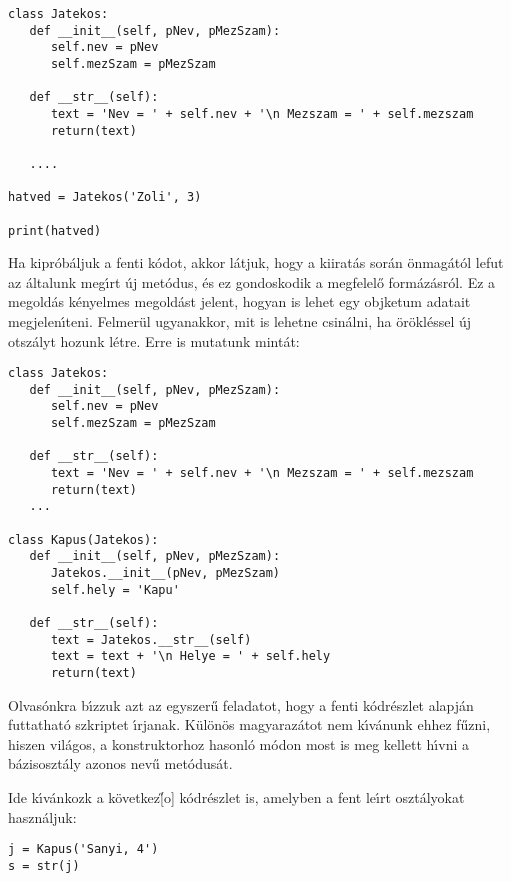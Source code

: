 \begin{Verbatim}[fontsize=\small]
class Jatekos:
   def __init__(self, pNev, pMezSzam):
      self.nev = pNev
      self.mezSzam = pMezSzam

   def __str__(self):
      text = 'Nev = ' + self.nev + '\n Mezszam = ' + self.mezszam
      return(text)

   ....

hatved = Jatekos('Zoli', 3)

print(hatved)
\end{Verbatim}

Ha kipr\'ob\'aljuk a fenti k\'odot, akkor l\'atjuk, hogy a kiirat\'as sor\'an \"onmag\'at\'ol lefut az 
\'altalunk meg\'{\i}rt \'uj met\'odus, \'es ez gondoskodik a megfelel\H{o} form\'az\'asr\'ol. Ez 
a megold\'as k\'enyelmes megold\'ast jelent, hogyan is lehet egy objketum adatait megjelen\'{\i}teni. 
Felmer\"ul ugyanakkor, mit is lehetne csin\'alni, ha \"or\"okl\'essel \'uj otsz\'alyt hozunk l\'etre. 
Erre is mutatunk mint\'at:

\begin{Verbatim}[fontsize=\small]
class Jatekos:
   def __init__(self, pNev, pMezSzam):
      self.nev = pNev
      self.mezSzam = pMezSzam

   def __str__(self):
      text = 'Nev = ' + self.nev + '\n Mezszam = ' + self.mezszam
      return(text)      
   ...

class Kapus(Jatekos):
   def __init__(self, pNev, pMezSzam):
      Jatekos.__init__(pNev, pMezSzam)
      self.hely = 'Kapu'

   def __str__(self):
      text = Jatekos.__str__(self)
      text = text + '\n Helye = ' + self.hely
      return(text)

\end{Verbatim}

Olvas\'onkra b\'{\i}zzuk azt az egyszer\H{u} feladatot, hogy a fenti k\'odr\'eszlet alapj\'an futtathat\'o szkriptet 
\'{\i}rjanak. K\"ul\"on\"os magyaraz\'atot nem k\'{\i}v\'anunk ehhez f\H{u}zni, hiszen vil\'agos, a konstruktorhoz 
hasonl\'o m\'odon most is meg kellett h\'{\i}vni a b\'azisoszt\'aly azonos nev\H{u} met\'odus\'at. 

Ide k\'{\i}v\'ankozk a k\"ovetkez\H[o] k\'odr\'eszlet is, amelyben a fent le\'{\i}rt oszt\'alyokat haszn\'aljuk:

\begin{Verbatim}[fontsize=\small]
j = Kapus('Sanyi, 4')
s = str(j)
\end{Verbatim}

